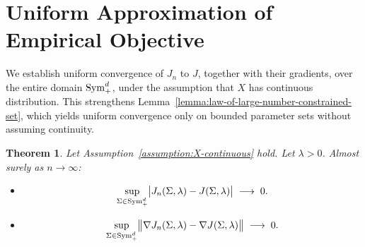 \documentclass[sn-mathphys-num]{sn-jnl}%
\numberwithin{equation}{section}
\newcommand{\norm}[1]{\left\|{#1}\right\|} %
\newcommand{\Sym}{{\rm \mathrm{Sym}}}
\theoremstyle{thmstyleone}%
\newtheorem{theorem}{Theorem}%
\theoremstyle{thmstyletwo}%
\theoremstyle{thmstylethree}%
\begin{document}
\section{Uniform Approximation of Empirical Objective} 
\label{sec:uniform-convergence}
\indent\indent
We establish uniform convergence of $J_n$ to $J$, together with their 
gradients, over the entire domain $\Sym_+^d$, under the assumption that $X$ has continuous distribution.
This strengthens Lemma~\ref{lemma:law-of-large-number-constrained-set}, which yields uniform 
convergence only on bounded parameter sets without assuming continuity.


\vspace{.5em} 
%

\begin{theorem}
\label{theorem:uniform-convergence}
Let Assumption~\ref{assumption:X-continuous} hold. Let $\lambda > 0$. Almost surely as $n \to \infty$: 
\vspace{.5em} 

\begin{itemize}
\item[$\mathsf{(a)}$]
\begin{equation*}
	\sup_{\Sigma \in \Sym_+^d} 
	\bigl|J_n(\Sigma, \lambda) - J(\Sigma, \lambda)\bigr|
	\;\longrightarrow\; 0.
\end{equation*}

\item[$\mathsf{(b)}$]
\begin{equation*}
	\sup_{\Sigma \in \Sym_+^d} 
	\bigl\|
	\nabla J_n(\Sigma, \lambda)
	-
	\nabla J(\Sigma, \lambda)
	\bigr\|
	\;\longrightarrow\; 0.
\end{equation*}
\end{itemize}
\end{theorem}
\end{document}
